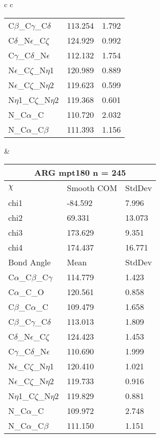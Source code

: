 \begin{longtable}{ c c }
\begin{tabular}{ l l l }
  C$\beta$\_C$\gamma$\_C$\delta$ & 113.254 & 1.792\\
  C$\delta$\_N$\epsilon$\_C$\zeta$ & 124.929 & 0.992\\
  C$\gamma$\_C$\delta$\_N$\epsilon$ & 112.132 & 1.754\\
  N$\epsilon$\_C$\zeta$\_N$\eta$1 & 120.989 & 0.889\\
  N$\epsilon$\_C$\zeta$\_N$\eta$2 & 119.623 & 0.599\\
  N$\eta$1\_C$\zeta$\_N$\eta$2 & 119.368 & 0.601\\
  N\_C$\alpha$\_C & 110.720 & 2.032\\
  N\_C$\alpha$\_C$\beta$ & 111.393 & 1.156\\
  \bottomrule
  \end{tabular}
  &
  \begin{tabular}{ l l l }
  \toprule
  \multicolumn{3}{c}{ARG \textbf{mpt180} n = 245} \\ \toprule
  $\chi$       & Smooth COM & StdDev \\ \midrule
  chi1 & -84.592 & 7.996 \\ 
  chi2 & 69.331 & 13.073 \\ 
  chi3 & 173.629 & 9.351 \\ 
  chi4 & 174.437 & 16.771 \\ \midrule
  Bond Angle   & Mean     & StdDev \\ \midrule
  C$\alpha$\_C$\beta$\_C$\gamma$ & 114.779 & 1.423\\
  C$\alpha$\_C\_O & 120.561 & 0.858\\
  C$\beta$\_C$\alpha$\_C & 109.479 & 1.658\\
  C$\beta$\_C$\gamma$\_C$\delta$ & 113.013 & 1.809\\
  C$\delta$\_N$\epsilon$\_C$\zeta$ & 124.423 & 1.453\\
  C$\gamma$\_C$\delta$\_N$\epsilon$ & 110.690 & 1.999\\
  N$\epsilon$\_C$\zeta$\_N$\eta$1 & 120.410 & 1.021\\
  N$\epsilon$\_C$\zeta$\_N$\eta$2 & 119.733 & 0.916\\
  N$\eta$1\_C$\zeta$\_N$\eta$2 & 119.829 & 0.881\\
  N\_C$\alpha$\_C & 109.972 & 2.748\\
  N\_C$\alpha$\_C$\beta$ & 111.150 & 1.151\\
  \bottomrule
  \end{tabular}
  \\
  \begin{tabular}{ l l l }

\end{tabular}
\end{longtable}
